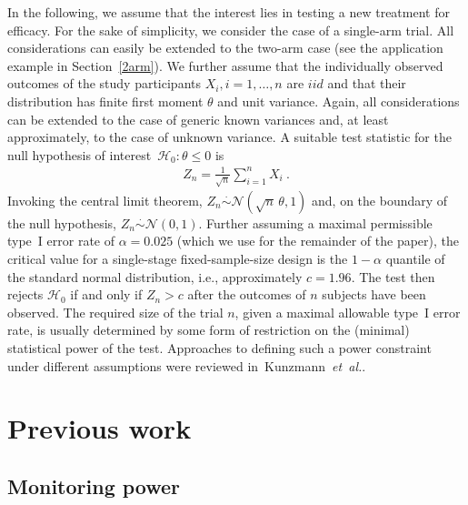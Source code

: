 \documentclass[12pt]{article}
\newcommand{\etal}{\textit{et~al.}}
\begin{document}
In the following,
we assume that the interest lies in testing a new treatment for efficacy.
For the sake of simplicity,
we consider the case of a single-arm trial.
All considerations can easily be extended to the two-arm case (see the application example in Section~\ref{2arm}).
We further assume that the individually observed outcomes of the study participants $X_i, i = 1,\ldots,n$ are $iid$ and that their distribution has finite first moment $\theta$ and unit variance.
Again, all considerations can be extended to the case of
generic known variances and,
at least approximately, to the case of unknown variance.
A suitable test statistic for the null hypothesis of interest~${\mathcal{H}_0:\theta\leq0}$ is
\begin{align}
    Z_n = \frac{1}{\sqrt{n}} \sum_{i=1}^n X_i \ .
\end{align}
Invoking the central limit theorem,
$Z_n\stackrel{\cdot}{\sim}\mathcal{N}(\sqrt{n}\,\theta, 1)$
and,
on the boundary of the null hypothesis, $Z_n\stackrel{\cdot}{\sim}\mathcal{N}(0, 1)$.
Further assuming a maximal permissible type~I error rate of $\alpha=0.025$ (which we use for the remainder of the paper), the critical value for a single-stage fixed-sample-size design is the
$1-\alpha$ quantile of the standard normal distribution, i.e., approximately $c=1.96$.
The test then rejects $\mathcal{H}_0$ if and only if $Z_n > c$ after the outcomes of $n$ subjects have been observed.
The required size of the trial $n$, given a maximal allowable type~I error
rate, is usually determined by some form of restriction on
the (minimal) statistical power of the test.
Approaches to defining such a power constraint under
different assumptions were reviewed in~Kunzmann~\etal\cite{kunzmann2020}.


\section{Previous work}

\subsection{Monitoring power} %
\label{sec:monitoring-power}
\end{document}
